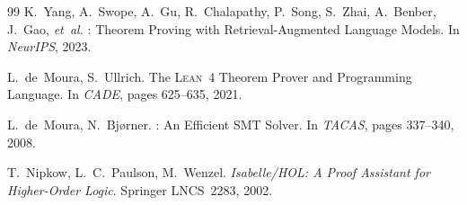 \documentclass[11pt]{article}
\begin{document}
\begin{thebibliography}{99}
K.~Yang, A.~Swope, A.~Gu, R.~Chalapathy, P.~Song, S.~Zhai,
  A.~Benber, J.~Gao, \emph{et~al.}
: Theorem Proving with Retrieval-Augmented
  Language Models.
\newblock In \emph{NeurIPS}, 2023.

L.~de~Moura, S.~Ullrich.
\newblock The \textsc{Lean}~4 Theorem Prover and Programming Language.
\newblock In \emph{CADE}, pages 625--635, 2021.

L.~de~Moura, N.~Bj{\o}rner.
: An Efficient {SMT} Solver.
\newblock In \emph{TACAS}, pages 337--340, 2008.

T.~Nipkow, L.~C.~Paulson, M.~Wenzel.
\newblock \emph{Isabelle/HOL: A Proof Assistant for Higher-Order Logic}.
\newblock Springer LNCS~2283, 2002.

\end{thebibliography}
\end{document}
